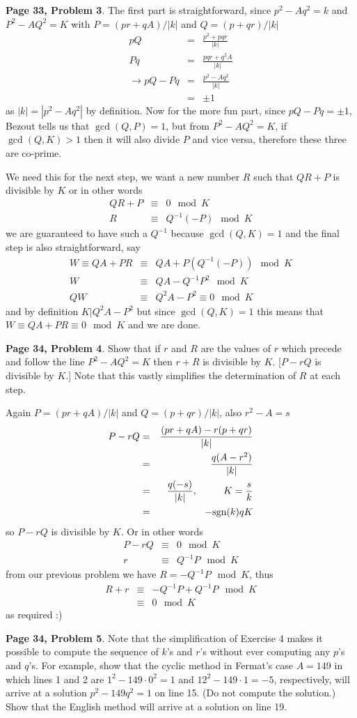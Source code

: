 \documentclass[aps,preprint,preprintnumbers,nofootinbib,showpacs,prd]{revtex4-1}
\newcommand{\nbea}{\begin{eqnarray*}}
\newcommand{\neea}{\end{eqnarray*}}
\begin{document}
{\bf Page 33, Problem 3}. The first part is straightforward, since $p^2 - Aq^2 = k$ and $P^2 - AQ^2 = K$ with $P = (pr + qA)/|k|$ and $Q = (p + qr)/|k|$
%
\nbea
pQ & = & \frac{p^2 + pqr}{|k|} \\
Pq & = & \frac{pqr + q^2A}{|k|} \\
\to pQ - Pq & = & \frac{p^2 - Aq^2}{|k|} \\
& = & \pm 1
\neea
%
as $|k| = |p^2-Aq^2|$ by definition. Now for the more fun part, since $pQ - Pq = \pm1$, Bezout tells us that $\gcd(Q, P) = 1$, but from $P^2 - AQ^2 = K$, if $\gcd(Q,K) > 1$ then it will also divide $P$ and vice versa, therefore these three are co-prime.

We need this for the next step, we want a new number $R$ such that $QR + P$ is divisible by $K$ or in other words
%
\nbea
QR + P & \equiv & 0 \mod{K} \\
R & \equiv & Q^{-1}(-P) \mod{K}
\neea
%
we are guaranteed to have such a $Q^{-1}$ because $\gcd(Q,K) = 1$ and the final step is also straightforward, say
%
\nbea
W \equiv QA + PR & \equiv & QA + P(Q^{-1}(-P)) \mod{K} \\
W & \equiv & QA - Q^{-1} P^2 \mod{K} \\
QW & \equiv & Q^2A - P^2 \equiv 0 \mod{K}
\neea
%
and by definition $K|Q^2A - P^2$ but since $\gcd(Q,K) = 1$ this means that $W \equiv QA + PR \equiv 0 \mod{K}$ and we are done.

{\bf Page 34, Problem 4}. Show that if $r$ and $R$ are the values of $r$ which precede and follow the line $P^2 - AQ^2 = K$ then $r + R$ is divisible by $K$. [$P-rQ$ is divisible by $K$.] Note that this vastly simplifies the determination of $R$ at each step.

Again $P = (pr + qA)/|k|$ and $Q = (p + qr)/|k|$, also $r^2 - A = s$
%
\nbea
P - rQ & = & \frac{(pr + qA) - r(p + qr)}{|k|} \\
& = & \frac{q(A-r^2)}{|k|} \\
& = & \frac{q(-s)}{|k|}, ~~~~~~~~ K = \frac{s}{k} \\
& = & -{\rm sgn}(k) qK
\neea
%
so $P- rQ$ is divisible by $K$. Or in other words
%
\nbea
P - rQ & \equiv & 0 \mod{K} \\
r & \equiv & Q^{-1}P \mod{K}
\neea
%
from our previous problem we have $R = -Q^{-1}P \mod{K}$, thus
%
\nbea
R + r & \equiv & -Q^{-1}P + Q^{-1}P \mod{K} \\
& \equiv & 0 \mod{K}
\neea
%
as required :)

{\bf Page 34, Problem 5}. Note that the simplification of Exercise 4 makes it possible to compute the sequence of $k$'s and $r$'s without ever computing any $p$'s and $q$'s. For example, show that the cyclic method in Fermat's case $A = 149$ in which lines 1 and 2 are $1^2 - 149\cdot0^2 = 1$ and $12^2 - 149\cdot 1 = -5$, respectively, will arrive at a solution $p^2 - 149q^2 = 1$ on line 15. (Do not compute the solution.) Show that the English method will arrive at a solution on line 19.
\end{document}
